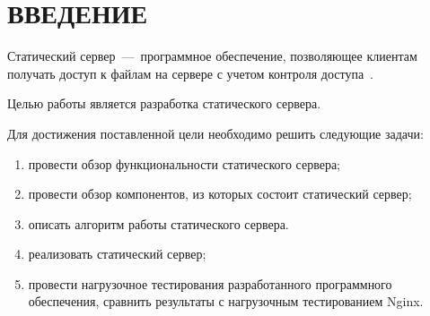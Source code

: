 \chapter*{ВВЕДЕНИЕ}

Статический сервер~---~программное обеспечение, позволяющее клиентам получать доступ к файлам на сервере с учетом контроля доступа~\cite{intro}.

Целью работы является разработка статического сервера.

Для достижения поставленной цели необходимо решить следующие задачи:

\begin{enumerate}
	\item провести обзор функциональности статического сервера;
	\item провести обзор компонентов, из которых состоит статический сервер;
	\item описать алгоритм работы статического сервера.
	\item реализовать статический сервер;
	\item провести нагрузочное тестирования разработанного программного обеспечения, сравнить результаты с нагрузочным тестированием Nginx.
\end{enumerate}